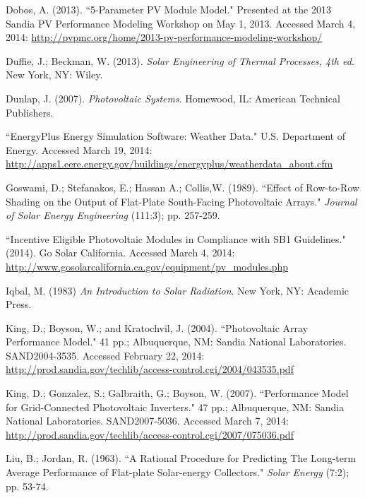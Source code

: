 \documentclass[12pt,letterpaper]{article}
\begin{document}
\begin{thebibliography}{99}
 Dobos, A. (2013). ``5-Parameter PV Module Model." Presented at the 2013 Sandia PV Performance Modeling Workshop on May 1, 2013. Accessed March 4, 2014: \url{http://pvpmc.org/home/2013-pv-performance-modeling-workshop/}

 Duffie, J.; Beckman, W. (2013). \textit{Solar Engineering of Thermal Processes, 4th ed}. New York, NY: Wiley.

 Dunlap, J. (2007). \textit{Photovoltaic Systems}. Homewood, IL: American Technical Publishers.

 ``EnergyPlus Energy Simulation Software: Weather Data." U.S. Department of Energy. Accessed March 19, 2014: \url{http://apps1.eere.energy.gov/buildings/energyplus/weatherdata_about.cfm}

 Goswami, D.; Stefanakos, E.; Hassan A.; Collis,W. (1989). ``Effect of Row-to-Row Shading on the Output of Flat-Plate South-Facing Photovoltaic Arrays." \textit{Journal of Solar Energy Engineering} (111:3); pp. 257-259.

 ``Incentive Eligible Photovoltaic Modules in Compliance with SB1 Guidelines." (2014). Go Solar California. Accessed March 4, 2014: \url{http://www.gosolarcalifornia.ca.gov/equipment/pv_modules.php}

 Iqbal, M. (1983) \textit{An Introduction to Solar 
Radiation}. New York, NY: Academic Press.

  King, D.; Boyson, W.; and Kratochvil, J. (2004). ``Photovoltaic Array Performance Model." 41 pp.; Albuquerque, NM: Sandia National Laboratories. SAND2004-3535. Accessed February 22, 2014: \url{http://prod.sandia.gov/techlib/access-control.cgi/2004/043535.pdf}

 King, D.; Gonzalez, S.; Galbraith, G.; Boyson, W. (2007). ``Performance Model for Grid-Connected Photovoltaic Inverters." 47 pp.; Albuquerque, NM: Sandia National Laboratories. SAND2007-5036. Accessed March 7, 2014: \url{http://prod.sandia.gov/techlib/access-control.cgi/2007/075036.pdf}

 Liu, B.; Jordan, R. (1963). ``A Rational Procedure for Predicting The Long-term Average Performance of Flat-plate Solar-energy Collectors." \textit{Solar Energy} (7:2); pp. 53-74.


\end{thebibliography}
\end{document}

